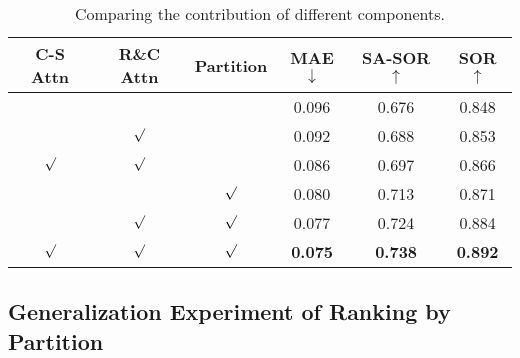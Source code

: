 \documentclass[sigconf]{acmart}
\begin{document}
\begin{table}[t]
    \caption{Comparing the contribution of different components.}
    \label{table:Ablation of component}
    \setlength{\tabcolsep}{2mm}
    \begin{tabular}{c|c|c|c|c|c}
    \toprule[1pt]
    C-S Attn & R\&C Attn  & Partition & MAE$\downarrow$   & SA-SOR$\uparrow$   & SOR$\uparrow$   \\ \hline
            &           &           & 0.096  & 0.676    & 0.848 \\
            & $\surd$   &           & 0.092  & 0.688    & 0.853 \\
    $\surd$ & $\surd$   &           & 0.086  & 0.697    & 0.866 \\
            &           & $\surd$   & 0.080  & 0.713    & 0.871 \\
            & $\surd$   & $\surd$   & 0.077  & 0.724    & 0.884 \\
    $\surd$ & $\surd$   & $\surd$   & \textbf{0.075}  & \textbf{0.738}    & \textbf{0.892} \\
    \bottomrule[1pt]
    \end{tabular}
\end{table}

\subsection{Generalization Experiment of Ranking by Partition}
\end{document}
